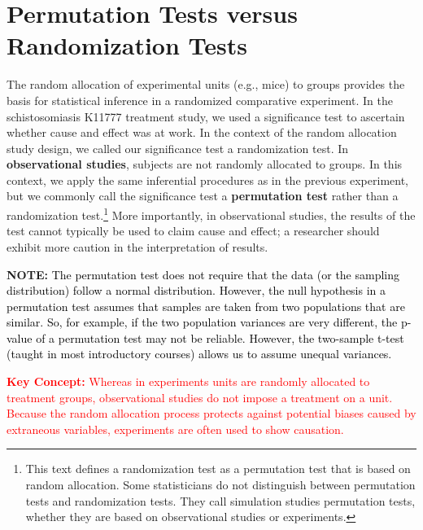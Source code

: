 \documentclass[
]{report}
\begin{document}
\section{\texorpdfstring{\textbf{Permutation Tests versus Randomization Tests}}{Permutation Tests versus Randomization Tests}}\label{permutation-tests-versus-randomization-tests}

The random allocation of experimental units (e.g., mice) to groups provides the basis for statistical inference in
a randomized comparative experiment. In the schistosomiasis K11777 treatment study, we used a significance
test to ascertain whether cause and effect was at work. In the context of the random allocation study design,
we called our significance test a randomization test.
\textbar{} In \textbf{observational studies}, subjects are not randomly allocated to groups. In this context, we apply the
same inferential procedures as in the previous experiment, but we commonly call the significance test a
\textbf{permutation test} rather than a randomization test.\footnote{This text defines a randomization test as a permutation test that is based on random allocation. Some statisticians do not
  distinguish between permutation tests and randomization tests. They call simulation studies permutation tests, whether
  they are based on observational studies or experiments.} More importantly, in observational studies, the results
of the test cannot typically be used to claim cause and effect; a researcher should exhibit more caution in the
interpretation of results.

\large

\textbf{NOTE:}
\textcolor{black}{The permutation test does not require that the data (or the sampling distribution) follow a normal distribution.
However, the null hypothesis in a permutation test assumes that samples are taken from two populations
that are similar. So, for example, if the two population variances are very different, the p-value of a
permutation test may not be reliable. However, the two-sample t-test (taught in most introductory courses)
allows us to assume unequal variances.}

\Large

\textbf{\textcolor{red}{Key Concept:}}
\textcolor{red}{Whereas in experiments units are randomly allocated to treatment groups, observational studies do not
impose a treatment on a unit. Because the random allocation process protects against potential biases
caused by extraneous variables, experiments are often used to show causation.}
\end{document}
